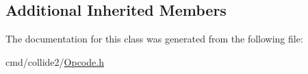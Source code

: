 \subsection*{Additional Inherited Members}


The documentation for this class was generated from the following file\+:\begin{DoxyCompactItemize}
\item 
cmd/collide2/\hyperlink{Opcode_8h}{Opcode.\+h}\end{DoxyCompactItemize}
